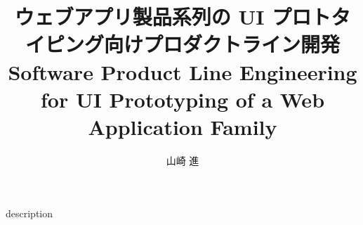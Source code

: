 \documentclass[11pt,a4paper,twocolumn]{jarticle}
\title {ウェブアプリ製品系列の UI プロトタイピング向けプロダクトライン開発 \\ Software Product Line Engineering for UI Prototyping of a Web Application Family}
\author {山崎 進}
\begin{document}
\maketitle
 {description}
\end{document}
